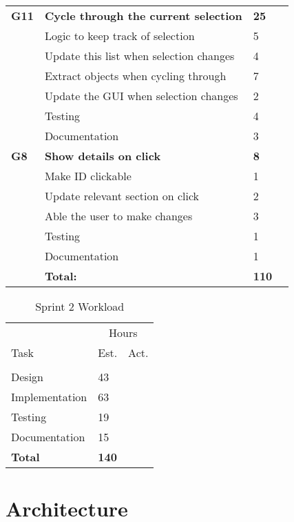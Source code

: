 \begin{table}
\begin{tabular}{ l p{8cm} l l }
 \bf{G11}	  &\bf{Cycle through the current selection}	&\bf{25}		&\bf{}		     \\
		  &Logic to keep track of selection			&5			&		\\
		  &Update this list when selection changes	&4			&		\\
		  &Extract objects when cycling through		&7			&		\\
		  &Update the GUI when selection changes	&2			&		\\
		  &Testing							&4			&		\\
		  &Documentation						&3			&		\\

\bf{G8}	  &\bf{Show details on click}			&\bf{8}		&\bf{}		     \\
		  &Make ID clickable					&1			&		\\
		  &Update relevant section on click		&2			&		\\
		  &Able the user to make changes		&3			&		\\
		  &Testing						&1			&		\\
		  &Documentation					&1			&		\\
\hline 
		  &\bf{Total:}						&\bf{110}		&\bf{}		\\
\hline
\end{tabular}
\label{table:sp2usrstories}
\end{table}

\begin{table}
\caption{Sprint 2 Workload}
\centering
\begin{tabular}{ l l l }
\hline 
            &\multicolumn{2}{c}{Hours}          \\
 Task       &Est.           &Act.                                  \\ 
\hline \\ [-2.0ex]
Design          &43     &     \\
Implementation  &63     &     \\
Testing         &19     &     \\
Documentation   &15     &     \\
\hline
\bf{Total}          &\bf{140}   &       \\
\hline
\end{tabular}
\label{table:sp2workload}
\end{table}

\section{Architecture}
